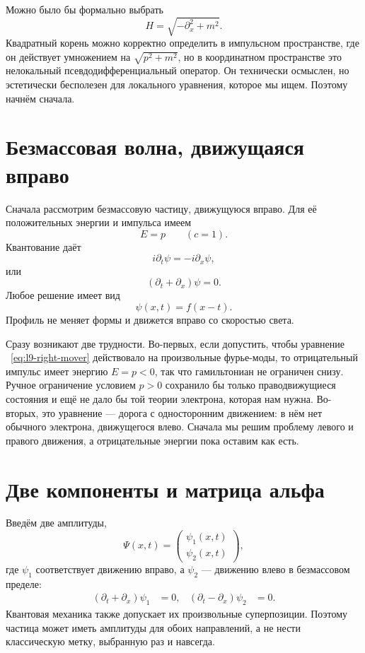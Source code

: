 Можно было бы формально выбрать
\begin{equation}
H=\sqrt{-\partial_x^2+m^2}.
\end{equation}
Квадратный корень можно корректно определить в импульсном пространстве, где он действует умножением на \(\sqrt{p^2+m^2}\), но в координатном пространстве это нелокальный псевдодифференциальный оператор. Он технически осмыслен, но эстетически бесполезен для локального уравнения, которое мы ищем. Поэтому начнём сначала.

\section{Безмассовая волна, движущаяся вправо}

Сначала рассмотрим безмассовую частицу, движущуюся вправо. Для её положительных энергии и импульса имеем
\begin{equation}
E=p
\qquad (c=1).
\end{equation}
Квантование даёт
\begin{equation}
i\partial_t\psi=-i\partial_x\psi,
\end{equation}
или
\begin{equation}
(\partial_t+\partial_x)\psi=0.
\label{eq:l9-right-mover}
\end{equation}
Любое решение имеет вид
\begin{equation}
\psi(x,t)=f(x-t).
\end{equation}
Профиль не меняет формы и движется вправо со скоростью света.

Сразу возникают две трудности. Во-первых, если допустить, чтобы уравнение ~\eqref{eq:l9-right-mover} действовало на произвольные фурье-моды, то отрицательный импульс имеет энергию \(E=p<0\), так что гамильтониан не ограничен снизу. Ручное ограничение условием \(p>0\) сохранило бы только праводвижущиеся состояния и ещё не дало бы той теории электрона, которая нам нужна. Во-вторых, это уравнение — дорога с односторонним движением: в нём нет обычного электрона, движущегося влево. Сначала мы решим проблему левого и правого движения, а отрицательные энергии пока оставим как есть.

\section{Две компоненты и матрица альфа}

Введём две амплитуды,
\begin{equation}
\Psi(x,t)=
\begin{pmatrix}
\psi_1(x,t)\\[3pt]
\psi_2(x,t)
\end{pmatrix},
\end{equation}
где \(\psi_1\) соответствует движению вправо, а \(\psi_2\) — движению влево в безмассовом пределе:
\begin{align}
(\partial_t+\partial_x)\psi_1&=0,
&
(\partial_t-\partial_x)\psi_2&=0.
\end{align}
Квантовая механика также допускает их произвольные суперпозиции. Поэтому частица может иметь амплитуды для обоих направлений, а не нести классическую метку, выбранную раз и навсегда.


